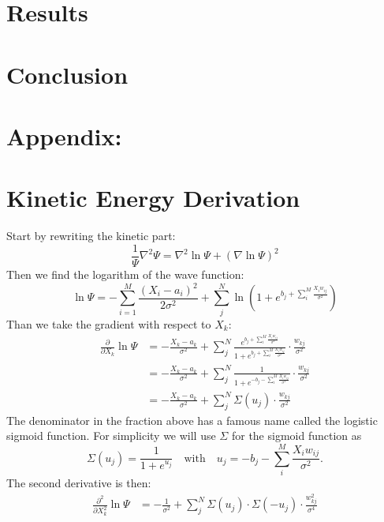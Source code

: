 \documentclass[12pt,a4paper,english]{article}
\begin{document}
\section{Results}
\label{sect:Results}
\section{Conclusion}
\label{sect:Conclusion}

\appendix
\section*{Appendix:}
\section{Kinetic Energy Derivation}
\label{appendix:E_k}
Start by rewriting the kinetic part:
\begin{equation}
\label{eq:Wave_Laplacian}
\frac{1}{\Psi}\nabla^2\Psi=\nabla^2\ln\Psi + (\nabla\ln\Psi)^2
\end{equation}
Then we find the logarithm of the wave function:
\begin{equation}
\ln\Psi=-\sum_{i=1}^{M}\frac{(X_i-a_i)^2}{2\sigma^2}+\sum_{j}^{N}\ln\left(1+e^{b_j + \sum_{i}^{M}\frac{X_iw_{ij}}{\sigma^2}}
\right)
\end{equation}
Than we take the gradient with respect to $X_k$:
\begin{align*}
\label{eq:Gradient_Xk}
\frac{\partial }{\partial X_k}\ln\Psi&=-\frac{X_k-a_k}{\sigma^2} + \sum_{j}^{N}\frac{e^{b_j + \sum_{i}^{M}\frac{X_iw_{ij}}{\sigma^2}}}{1+e^{b_j + \sum_{i}^{M}\frac{X_iw_{ij}}{\sigma^2}}}\cdot\frac{w_{kj}}{\sigma^2}\\ &=-\frac{X_k-a_k}{\sigma^2} + \sum_{j}^{N}\frac{1}{1+e^{-b_j - \sum_{i}^{M}\frac{X_iw_{ij}}{\sigma^2}}}\cdot\frac{w_{kj}}{\sigma^2}\\
&=-\frac{X_k-a_k}{\sigma^2} + \sum_{j}^{N}\Sigma(u_j)\cdot\frac{w_{kj}}{\sigma^2}
\end{align*}
The denominator in the fraction above has a famous name called the logistic sigmoid function. For simplicity we will use $\Sigma$ for the sigmoid function as
\begin{equation}
\label{eq:sigmoid}
\Sigma(u_j)=\frac{1}{1+e^{u_j}}\quad \text{with} \quad u_j=-b_j - \sum_{i}^{M}\frac{X_iw_{ij}}{\sigma^2}.
\end{equation}
The second derivative is then:
\begin{align*}
\frac{\partial^2 }{\partial X_k^2}\ln\Psi&=-\frac{1}{\sigma^2}+\sum_{j}^{N}\Sigma(u_j)\cdot\Sigma(-u_j)\cdot\frac{w_{kj}^2}{\sigma^4}
\end{align*}
\end{document}
